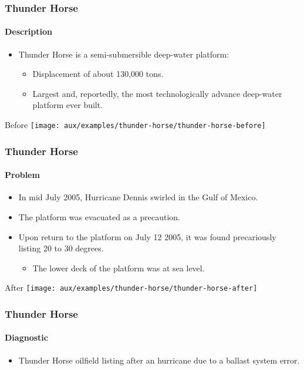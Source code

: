 \begin{frame}[hasprev=false, hasnext=true]
\label{example:thunder-horse}
\frametitle{Thunder Horse}
\framesubtitle{Description}

\begin{itemize}
	\item Thunder Horse is a semi-submersible deep-water platform:
	\begin{itemize}
		\item Displacement of about 130,000 tons.
		\item Largest and, reportedly, the most technologically advance
		deep-water platform ever built.
	\end{itemize}
\end{itemize}

\begin{block:ie}{Before}
	\texttt{[image: aux/examples/thunder-horse/thunder-horse-before]}
\end{block:ie}
\end{frame}


\begin{frame}[hasprev=true, hasnext=true]
\frametitle{Thunder Horse}
\framesubtitle{Problem}

\begin{itemize}
	\item In mid July 2005, Hurricane Dennis swirled in the Gulf of Mexico.

	\item The platform was evacuated as a precaution.

	\item Upon return to the platform on July 12 2005, it was found
	precariously listing 20 to 30 degrees.
	\begin{itemize}
		\item The lower deck of the platform was at sea level.
	\end{itemize}
\end{itemize}

\begin{block:ie}{After}
	\centering
	\texttt{[image: aux/examples/thunder-horse/thunder-horse-after]}
\end{block:ie}
\end{frame}


\begin{frame}[hasprev=true, hasnext=false]
\frametitle{Thunder Horse}
\framesubtitle{Diagnostic}

\begin{itemize}
	\item Thunder Horse oilfield listing after an hurricane due to a ballast
	system error.
\end{itemize}
\end{frame}